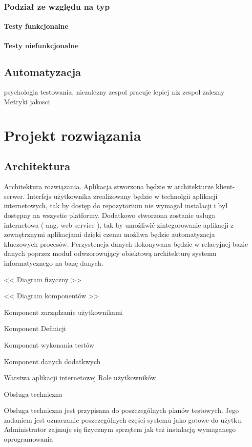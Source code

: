 \subsection{Podział ze względu na typ}
\subsubsection{Testy funkcjonalne}
\subsubsection{Testy niefunkcjonalne}
\section{Automatyzacja}
psychologia testowania, niezalezny zespol pracuje lepiej niz zespol zalezny
Metryki jakosci

\chapter{Projekt rozwiązania}
\section{Architektura}
Architektura rozwiązania. Aplikacja stworzona będzie w architekturze klient-serwer. Interfejs użytkownika zrealizowany będzie w technolgii aplikacji internetowych, tak by dostęp do repozytorium nie wymagał instalacji i był dostępny na wszystie platformy. Dodatkowo stworzona zostanie usługa internetowa ( ang. web service ), tak by umożliwić zintegorowanie aplikacji z zewnętrznymi aplikacjami dzięki czemu możliwa będzie automatyzacja kluczowych procesów. Perzystencja danych dokonywana będzie w relacyjnej bazie danych poprzez moduł odwzorowujący obiektową architekturę systemu informatycznego na bazę danych.

<< Diagram fizyczny >>

<< Diagram komponentów >>

Komponent zarządzanie użytkownikami

Komponent Definicji 

Komponent wykonania testów

Komponent danych dodatkwych

Warstwa aplikacji internetowej
Role użytkowników

Obsługa techniczna

Obsługa techniczna jest przypisana do poszczególnych planów testowych. Jego zadaniem jest oznaczanie poszczególnych części systemu jako gotowe do użytku. Administrator zajmuje się fizycznym sprzętem jak też instalacją wymaganego oprogramowania

